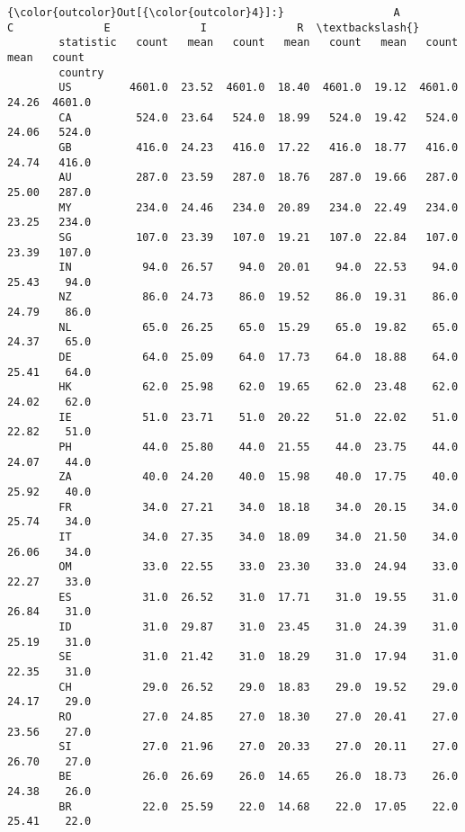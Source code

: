 \documentclass[11pt]{article}
\begin{document}
            \begin{Verbatim}[commandchars=\\\{\}]
{\color{outcolor}Out[{\color{outcolor}4}]:}                 A              C              E              I              R  \textbackslash{}
        statistic   count   mean   count   mean   count   mean   count   mean   count   
        country                                                                         
        US         4601.0  23.52  4601.0  18.40  4601.0  19.12  4601.0  24.26  4601.0   
        CA          524.0  23.64   524.0  18.99   524.0  19.42   524.0  24.06   524.0   
        GB          416.0  24.23   416.0  17.22   416.0  18.77   416.0  24.74   416.0   
        AU          287.0  23.59   287.0  18.76   287.0  19.66   287.0  25.00   287.0   
        MY          234.0  24.46   234.0  20.89   234.0  22.49   234.0  23.25   234.0   
        SG          107.0  23.39   107.0  19.21   107.0  22.84   107.0  23.39   107.0   
        IN           94.0  26.57    94.0  20.01    94.0  22.53    94.0  25.43    94.0   
        NZ           86.0  24.73    86.0  19.52    86.0  19.31    86.0  24.79    86.0   
        NL           65.0  26.25    65.0  15.29    65.0  19.82    65.0  24.37    65.0   
        DE           64.0  25.09    64.0  17.73    64.0  18.88    64.0  25.41    64.0   
        HK           62.0  25.98    62.0  19.65    62.0  23.48    62.0  24.02    62.0   
        IE           51.0  23.71    51.0  20.22    51.0  22.02    51.0  22.82    51.0   
        PH           44.0  25.80    44.0  21.55    44.0  23.75    44.0  24.07    44.0   
        ZA           40.0  24.20    40.0  15.98    40.0  17.75    40.0  25.92    40.0   
        FR           34.0  27.21    34.0  18.18    34.0  20.15    34.0  25.74    34.0   
        IT           34.0  27.35    34.0  18.09    34.0  21.50    34.0  26.06    34.0   
        OM           33.0  22.55    33.0  23.30    33.0  24.94    33.0  22.27    33.0   
        ES           31.0  26.52    31.0  17.71    31.0  19.55    31.0  26.84    31.0   
        ID           31.0  29.87    31.0  23.45    31.0  24.39    31.0  25.19    31.0   
        SE           31.0  21.42    31.0  18.29    31.0  17.94    31.0  22.35    31.0   
        CH           29.0  26.52    29.0  18.83    29.0  19.52    29.0  24.17    29.0   
        RO           27.0  24.85    27.0  18.30    27.0  20.41    27.0  23.56    27.0   
        SI           27.0  21.96    27.0  20.33    27.0  20.11    27.0  26.70    27.0   
        BE           26.0  26.69    26.0  14.65    26.0  18.73    26.0  24.38    26.0   
        BR           22.0  25.59    22.0  14.68    22.0  17.05    22.0  25.41    22.0   

\end{Verbatim}
\end{document}
